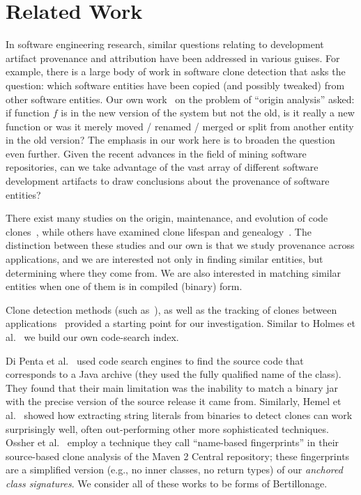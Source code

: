 \section{Related Work{\label{sec:background}}}

In software engineering research, similar questions relating to development
artifact provenance and attribution have been addressed in various guises.
For example, there is a large body of work in software clone detection that
asks the question: which software entities have been copied (and possibly
tweaked) from other software entities.  Our own work~\cite{Godfrey2005tse}
on the problem of ``origin analysis'' asked: if function $f$ is in the new
version of the system but not the old, is it really a new function or was
it merely moved / renamed / merged or split from another entity in the old
version?  The emphasis in our work here is to broaden the question even
further.  Given the recent advances in the field of mining software
repositories, can we take advantage of the vast array of different
software development artifacts to draw conclusions about the provenance of
software entities?


There exist many studies on the origin, maintenance, and evolution of code
clones~\cite{KapserG08,Krinke2008,Lozano2008,Lozano2007,ST09}, while others
have examined clone lifespan and genealogy~\cite{Kim2005fse}.  The
distinction between these studies and our own is that we study provenance
across applications, and we are interested not only in finding similar
entities, but determining where they come from.  We are also interested in
matching similar entities when one of them is in compiled (binary) form.

Clone detection methods (such as~\cite{KamiyaKI02,LivieriHMI07}), as well
as the tracking of clones between applications~\cite{GermanPGA09} provided
a starting point for our investigation.  Similar to Holmes et
al.~\cite{HolmesWM06} we build our own code-search index.

Di Penta et al.~\cite{DiPentaMSR2010} used code search engines to find the
source code that corresponds to a Java archive (they used the fully
qualified name of the class). They found that their main limitation was the
inability to match a binary jar with the precise version of the source release
it came from.
Similarly, Hemel et al.~\cite{HemelKVD11} showed how extracting
string literals from binaries to detect clones can work surprisingly well,
often out-performing other more sophisticated techniques.
Ossher et al.~\cite{OssherSL11} employ a technique they call
``name-based fingerprints'' in their source-based clone analysis of the Maven 2
Central repository; these fingerprints are a simplified version (e.g., no inner classes,
no return types) of our \emph{anchored class signatures}. 
We consider all of these works to be forms of Bertillonage.


